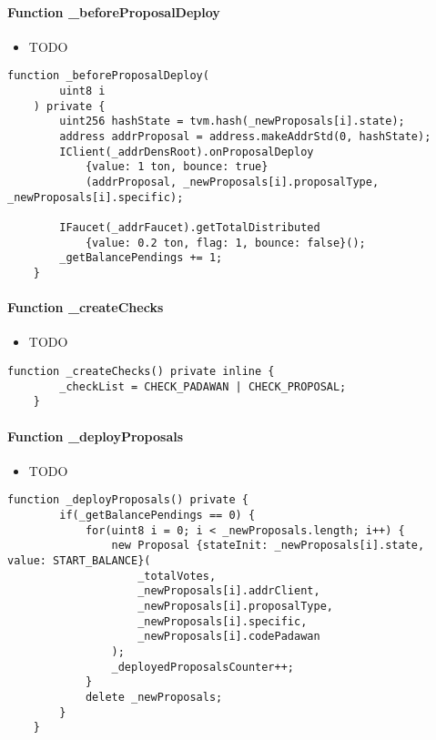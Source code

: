\paragraph{Function \_{}beforeProposalDeploy}

\begin{itemize}
\item TODO
\end{itemize}

\begin{lstlisting}[firstnumber=134]
    function _beforeProposalDeploy(
        uint8 i
    ) private {
        uint256 hashState = tvm.hash(_newProposals[i].state);
        address addrProposal = address.makeAddrStd(0, hashState);
        IClient(_addrDensRoot).onProposalDeploy
            {value: 1 ton, bounce: true}
            (addrProposal, _newProposals[i].proposalType, _newProposals[i].specific);

        IFaucet(_addrFaucet).getTotalDistributed
            {value: 0.2 ton, flag: 1, bounce: false}();
        _getBalancePendings += 1;
    }
\end{lstlisting}

\paragraph{Function \_{}createChecks}

\begin{itemize}
\item TODO
\end{itemize}

\begin{lstlisting}[firstnumber=54]
    function _createChecks() private inline {
        _checkList = CHECK_PADAWAN | CHECK_PROPOSAL;
    }
\end{lstlisting}

\paragraph{Function \_{}deployProposals}

\begin{itemize}
\item TODO
\end{itemize}

\begin{lstlisting}[firstnumber=156]
    function _deployProposals() private {
        if(_getBalancePendings == 0) {
            for(uint8 i = 0; i < _newProposals.length; i++) {
                new Proposal {stateInit: _newProposals[i].state, value: START_BALANCE}(
                    _totalVotes,
                    _newProposals[i].addrClient,
                    _newProposals[i].proposalType,
                    _newProposals[i].specific,
                    _newProposals[i].codePadawan
                );
                _deployedProposalsCounter++;
            }
            delete _newProposals;
        }
    }
\end{lstlisting}

